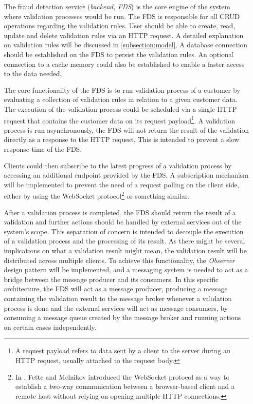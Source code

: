 The fraud detection service (\emph{backend, FDS}) is the core engine of the system where validation processes would be run. The FDS is responsible for all CRUD operations regarding the validation rules. User should be able to create, read, update and delete validation rules via an HTTP request. A detailed explanation on validation rules will be discussed in \autoref{subsection:model}. A database connection should be established on the FDS to persist the validation rules. An optional connection to a cache memory could also be established to enable a faster access to the data needed.

The core functionality of the FDS is to run validation process of a customer by evaluating a collection of validation rules in relation to a given customer data. The execution of the validation process could be scheduled via a single HTTP request that contains the customer data on its request payload\footnote{A request payload refers to data sent by a client to the server during an HTTP request, usually attached to the request body\autocite[section \enquote{4.3 Message Body}]{http-rfc}.}. A validation process is run asynchronously, the FDS will not return the result of the validation directly as a response to the HTTP request. This is intended to prevent a slow response time of the FDS. 

Clients could then subscribe to the latest progress of a validation process by accessing an additional endpoint provided by the FDS. A subscription mechanism will be implemented to prevent the need of a request polling on the client side, either by using the WebSocket protocol\footnote{In \autocite{rfc6455}, Fette and Melnikov introduced the WebSocket protocol as a way to establish a two-way communication between a browser-based client and a remote host without relying on opening multiple HTTP connections.} or something similar. 

After a validation process is completed, the FDS should return the result of a validation and further actions should be handled by external services out of the system's scope. This separation of concern is intended to decouple the execution of a validation process and the processing of its result. As there might be several implications on what a validation result might mean, the validation result will be distributed across multiple clients. To achieve this functionality, the \emph{Observer} \autocite[pp. 293-303]{gamma-1995} design pattern will be implemented, and a messaging system is needed to act as a bridge between the message producer and its consumers. In this specific architecture, the FDS will act as a message producer, producing a message containing the validation result to the message broker whenever a validation process is done and the external services will act as message consumers, by consuming a message queue created by the message broker and running actions on certain cases independently.